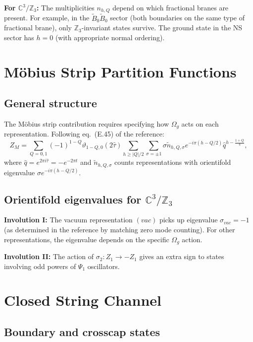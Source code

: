 \documentclass[11pt]{article}
\newcommand{\Z}{\mathbb{Z}}
\newcommand{\C}{\mathbb{C}}
\newcommand{\oo}{\Omega_g}
\begin{document}
\textbf{For $\C^3/\Z_3$:} The multiplicities $n_{h,Q}$ depend on which fractional branes are present. For example, in the $\tilde{B}_0 \tilde{B}_0$ sector (both boundaries on the same type of fractional brane), only $\Z_3$-invariant states survive. The ground state in the NS sector has $h = 0$ (with appropriate normal ordering).

\section{M\"obius Strip Partition Functions}

\subsection{General structure}

The M\"obius strip contribution requires specifying how $\oo$ acts on each representation. Following eq.~(E.45) of the reference:
\begin{equation}
Z_M = \sum_{Q=0,1} (-1)^{1-Q} \vartheta_{1-Q,0}(2\hat{\tau}) \sum_{h \geq |Q|/2} \sum_{\sigma=\pm 1} \sigma \tilde{n}_{h,Q,\sigma} e^{-i\pi(h - Q/2)} \hat{q}^{h - \frac{1+Q}{4}},
\end{equation}
where $\hat{q} = e^{2\pi i \hat{\tau}} = -e^{-2\pi t}$ and $\tilde{n}_{h,Q,\sigma}$ counts representations with orientifold eigenvalue $\sigma e^{-i\pi(h-Q/2)}$.

\subsection{Orientifold eigenvalues for $\C^3/\Z_3$}

\textbf{Involution I:} The vacuum representation $(vac)$ picks up eigenvalue $\sigma_{vac} = -1$ (as determined in the reference by matching zero mode counting). For other representations, the eigenvalue depends on the specific $\oo$ action.

\textbf{Involution II:} The action of $\sigma_2: Z_1 \to -Z_1$ gives an extra sign to states involving odd powers of $\Psi_1$ oscillators.

\section{Closed String Channel}

\subsection{Boundary and crosscap states}
\end{document}
